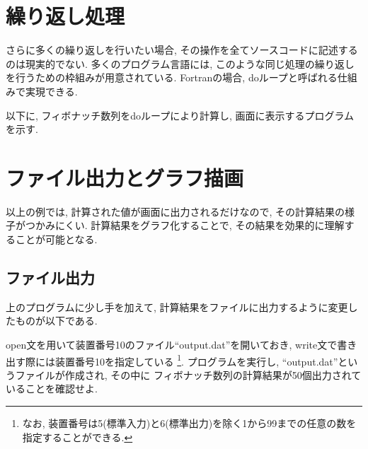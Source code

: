 \section{繰り返し処理}
さらに多くの繰り返しを行いたい場合, その操作を全てソースコードに記述するのは現実的でない. 
多くのプログラム言語には, このような同じ処理の繰り返しを行うための枠組みが用意されている. 
Fortranの場合, {\ttfamily do}ループと呼ばれる仕組みで実現できる. 

以下に, フィボナッチ数列を{\ttfamily do}ループにより計算し, 画面に表示するプログラムを示す. 


\fi



\section{ファイル出力とグラフ描画}
以上の例では, 計算された値が画面に出力されるだけなので, その計算結果の様子がつかみにくい. 
計算結果をグラフ化することで, その結果を効果的に理解することが可能となる. 




\subsection*{ファイル出力}
上のプログラムに少し手を加えて, 計算結果をファイルに出力するように変更したものが以下である.
%


open文を用いて装置番号10のファイル``output.dat''を開いておき,
write文で書き出す際には装置番号10を指定している
\footnote{
なお, 装置番号は5(標準入力)と6(標準出力)を除く1から99までの任意の数を指定することができる.
}.
プログラムを実行し, ``output.dat''というファイルが作成され, その中に
フィボナッチ数列の計算結果が50個出力されていることを確認せよ. 


